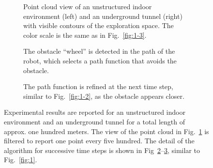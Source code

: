 \documentclass[lettersize,journal,twoside]{IEEEtran}
\theoremstyle{definition}
\begin{document}
\begin{figure*}[t]
  \vspace*{.1cm}
  \begin{subfigure}[m]{0.48\textwidth}
    \centering
    \hspace*{-1.2cm}
    
    \caption{Point cloud view of an unstructured indoor environment (left) and an underground tunnel (right) with visible contours of the exploration space. The color scale is the same as in Fig.~\ref{fig:1-3}.}
    \label{fig:2-1}
  \end{subfigure}
  \hfill
  \begin{subfigure}[m]{0.25\textwidth}
    \centering
    
    \caption{The obstacle ``wheel'' is detected in the path of the robot, which selects a path function that avoids the obstacle.}
    \vspace*{-1cm}
    \label{fig:2-2}
  \end{subfigure}
  \hfill
  \begin{subfigure}[m]{0.25\textwidth}
    \centering
    
    \caption{The path function is refined at the next time step, similar to Fig.~\ref{fig:1-2}, as the obstacle appears closer.}
    \vspace*{-1cm}
    \label{fig:2-3}
  \end{subfigure}
  \caption{Experimental results are reported for an unstructured indoor environment and an underground tunnel for a total length of approx. one hundred meters. The view of the point cloud in Fig.~\ref{fig:2-1} is filtered to report one point every five hundred. The detail of the algorithm for successive time steps is shown in Fig~\ref{fig:2-2}--\ref{fig:2-3}, similar to Fig.~\ref{fig:1}.}
  \label{fig:2}
  \vspace*{.3cm}
\end{figure*}
\end{document}
